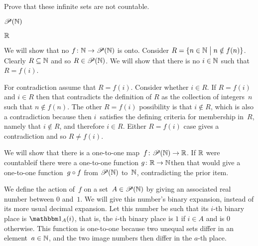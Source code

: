 \begin{ex}  Prove that these infinite sets are not countable.
\begin{exes}
\item $\mathscr{P}(\mathbb{N})$ 
\item $\mathbb{R}$
\end{exes}
\begin{ans}
\begin{exes}
\item We will show that no $\mbox{$f\colon \mathbb{N}\to \mathscr{P}(\mathbb{N})$}$ is onto.
  Consider $R=\{n\in\mathbb{N} \bigm| n\notin f(n)\}$.
  Clearly $R\subseteq \mathbb{N}$ and so $R\in\mathscr{P}(\mathbb{N})$.
  We will show that there is no $i\in\mathbb{N}$ such that $R=f(i)$.

  For contradiction assume that $R=f(i)$.
  Consider whether $i\in R$.
  If $R=f(i)$ and $i\in R$ then that contradicts the definition of $R$ as the 
  collection of integers~$n$ such that $n\notin f(n)$.
  The other $R=f(i)$ possibility is that $i\notin R$, which 
  is also a contradiction
  because then $i$~satisfies the defining criteria for membership in~$R$, namely
  that $i\notin R$, and therefore $i\in R$.
Either $R=f(i)$ case gives a contradiction and so $R\neq f(i)$.
\item We will show that there is a one-to-one map~$\mbox{$f\colon \mathscr{P}(\mathbb{N})\to \mathbb{R}$}$.
  If $\mathbb{R}$ were countable\Dash if there were a one-to-one 
  function $\mbox{$g\colon \mathbb{R}\to \mathbb{N}$}$\Dash then 
  that would give a one-to-one function~$g\mathbin{\circ} f$ 
  from $\mathscr{P}(\mathbb{N})$ to~$\mathbb{N}$,
  contradicting the prior item.

  We define the action of~$f$ on a set~$A\in\mathscr{P}(\mathbb{N})$ by
  giving an associated real number between $0$ and~$1$.
  We will give this number's binary expansion, instead of its more usual
  decimal expansion. 
  Let this number be such that its $i$-th binary place is $\charfcn{A}(i)$,
  that is, the $i$-th binary place is $1$ if $i\in A$ and is $0$ otherwise. 
  This function is one-to-one because two unequal sets differ in an 
  element~$a\in\mathbb{N}$, and the two image numbers then differ in the $a$-th place.
\end{exes}
\end{ans}
\end{ex}
